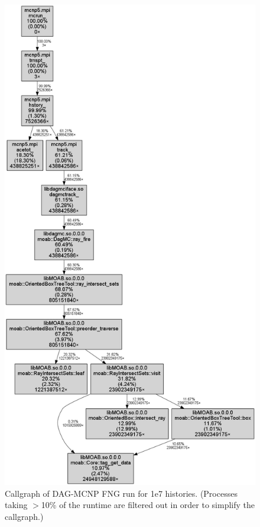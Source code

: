 \documentclass[12pt, a4paper]{article}
\begin{document}
\begin{figure}[H]
  \centering
  \caption{Callgraph of DAG-MCNP FNG run for 1e7 histories. (Processes taking $>$10\% of the runtime are filtered out in order to simplify the callgraph.) }
  \label{dagmc-fng-coarse}
  \includegraphics[scale=0.35]{dagmc_fng_cg_coarse.png}
\end{figure}
\end{document}
